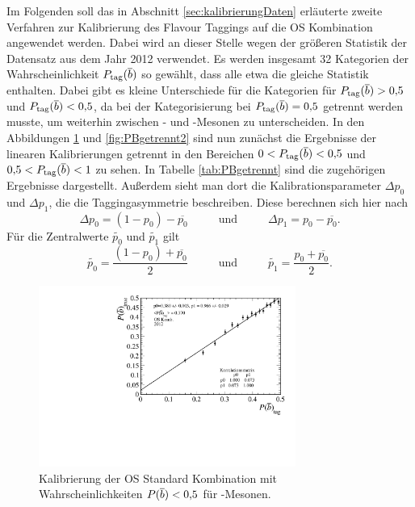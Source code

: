 Im Folgenden soll das in Abschnitt \ref{sec:kalibrierungDaten} erläuterte zweite Verfahren zur Kalibrierung des Flavour Taggings auf die OS Kombination angewendet werden. Dabei wird an dieser Stelle wegen der größeren Statistik der Datensatz aus dem Jahr \num{2012} verwendet. Es werden insgesamt \num{32} Kategorien der Wahrscheinlichkeit $P_\text{tag}({\overline {{b}}})$ so gewählt, dass alle etwa die gleiche Statistik enthalten. Dabei gibt es kleine Unterschiede für die Kategorien für $P_\text{tag}({\overline {{b}}})>0{,}5$ und $P_\text{tag}({\overline {{b}}})<0{,}5$, da bei der Kategorisierung bei $P_\text{tag}({\overline {{b}}})=0{,}5$ getrennt werden musste, um weiterhin zwischen \Bz- und \Bzb-Mesonen zu unterscheiden. In den Abbildungen \ref{fig:PBgetrennt1} und \ref{fig:PBgetrennt2} sind nun zunächst die Ergebnisse der linearen Kalibrierungen getrennt in den Bereichen $0<P_\text{tag}({\overline {{b}}})<0{,}5$ und $0{,}5<P_\text{tag}({\overline {{b}}})<1$ zu sehen. In Tabelle \ref{tab:PBgetrennt} sind die zugehörigen Ergebnisse dargestellt. Außerdem sieht man dort die Kalibrationsparameter $\Delta p_0$ und $\Delta p_1$, die die Taggingasymmetrie beschreiben. Diese berechnen sich hier nach
\begin{equation}
\Delta p_0=\left(1-p_0\right)-\overline{p_0}\hspace{1cm}\text{ und }\hspace{1cm}\Delta p_1=p_0-\overline{p_0}.
\end{equation}
Für die Zentralwerte $\widetilde{p_0}$ und $\widetilde{p_1}$ gilt
\begin{equation}
\widetilde{p_0}=\frac{\left(1-p_0\right)+\overline{p_0}}{2}\hspace{1cm}\text{ und }\hspace{1cm}\widetilde{p_1}=\frac{p_0+\overline{p_0}}{2}.
\end{equation}
 \begin{figure}[htbp]
	\centering
		\includegraphics[width=0.75\textwidth]{fig/calibration_Bbar.pdf}
	\caption{Kalibrierung der OS Standard Kombination mit Wahrscheinlichkeiten \mbox{$P({\overline {{b}}})<0{,}5$} für \Bzb-Mesonen.}
	\label{fig:PBgetrennt1} 
\end{figure} 
